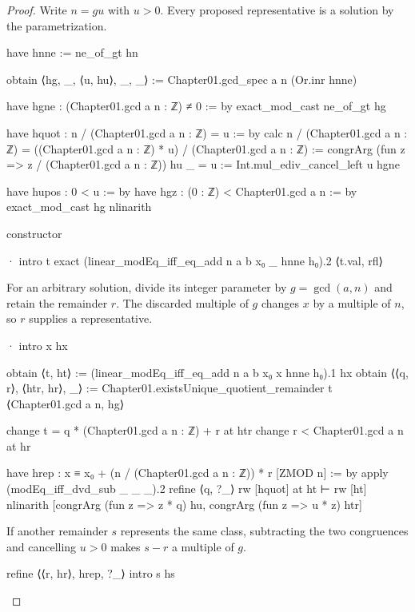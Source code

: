 \begin{proof}
  Write $n=gu$ with $u>0$.
  Every proposed representative is a solution by the parametrization.

  \begin{lean}
    have hnne := ne_of_gt hn

    obtain ⟨hg, _, ⟨u, hu⟩, _, _⟩ := Chapter01.gcd_spec a n (Or.inr hnne)

    have hgne : (Chapter01.gcd a n : ℤ) ≠ 0 := by
      exact_mod_cast ne_of_gt hg

    have hquot : n / (Chapter01.gcd a n : ℤ) = u := by
      calc
        n / (Chapter01.gcd a n : ℤ) =
            ((Chapter01.gcd a n : ℤ) * u) / (Chapter01.gcd a n : ℤ) :=
          congrArg (fun z => z / (Chapter01.gcd a n : ℤ)) hu
        _ = u := Int.mul_ediv_cancel_left u hgne

    have hupos : 0 < u := by
      have hgz : (0 : ℤ) < Chapter01.gcd a n := by
        exact_mod_cast hg
      nlinarith

    constructor

    · intro t
      exact (linear_modEq_iff_eq_add n a b x₀ _ hnne h₀).2 ⟨t.val, rfl⟩
  \end{lean}

  For an arbitrary solution, divide its integer parameter by $g=\gcd(a,n)$ and retain the
  remainder $r$.
  The discarded multiple of $g$ changes $x$ by a multiple of $n$, so $r$ supplies a representative.

  \begin{lean}
    · intro x hx

      obtain ⟨t, ht⟩ := (linear_modEq_iff_eq_add n a b x₀ x hnne h₀).1 hx
      obtain ⟨⟨q, r⟩, ⟨htr, hr⟩, _⟩ :=
        Chapter01.existsUnique_quotient_remainder t ⟨Chapter01.gcd a n, hg⟩

      change t = q * (Chapter01.gcd a n : ℤ) + r at htr
      change r < Chapter01.gcd a n at hr

      have hrep : x ≡ x₀ + (n / (Chapter01.gcd a n : ℤ)) * r [ZMOD n] := by
        apply (modEq_iff_dvd_sub _ _ _).2
        refine ⟨q, ?_⟩
        rw [hquot] at ht ⊢
        rw [ht]
        nlinarith [congrArg (fun z => z * q) hu, congrArg (fun z => u * z) htr]
  \end{lean}

  If another remainder $s$ represents the same class, subtracting the two congruences and
  cancelling $u>0$ makes $s-r$ a multiple of $g$.

  \begin{lean}
    refine ⟨⟨r, hr⟩, hrep, ?_⟩
    intro s hs


\end{lean}
\end{proof}
